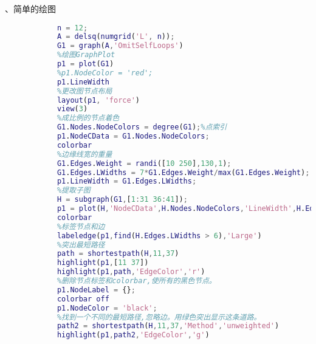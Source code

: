             、简单的绘图
            \begin{lstlisting}[language=Matlab]
            %创建graph
            n = 12;
            A = delsq(numgrid('L', n));
            G1 = graph(A,'OmitSelfLoops')
            %绘图GraphPlot
            p1 = plot(G1)
            %p1.NodeColor = 'red';
            p1.LineWidth
            %更改图节点布局
            layout(p1, 'force')
            view(3)
            %成比例的节点着色
            G1.Nodes.NodeColors = degree(G1);%点索引
            p1.NodeCData = G1.Nodes.NodeColors;
            colorbar
            %边缘线宽的重量
            G1.Edges.Weight = randi([10 250],130,1);
            G1.Edges.LWidths = 7*G1.Edges.Weight/max(G1.Edges.Weight);
            p1.LineWidth = G1.Edges.LWidths;
            %提取子图
            H = subgraph(G1,[1:31 36:41]);
            p1 = plot(H,'NodeCData',H.Nodes.NodeColors,'LineWidth',H.Edges.LWidths);
            colorbar
            %标签节点和边
            labeledge(p1,find(H.Edges.LWidths > 6),'Large')
            %突出最短路径
            path = shortestpath(H,11,37)
            highlight(p1,[11 37])
            highlight(p1,path,'EdgeColor','r')
            %删除节点标签和colorbar,使所有的黑色节点。
            p1.NodeLabel = {};
            colorbar off
            p1.NodeColor = 'black';
            %找到一个不同的最短路径,忽略边。用绿色突出显示这条道路。
            path2 = shortestpath(H,11,37,'Method','unweighted')
            highlight(p1,path2,'EdgeColor','g')
            \end{lstlisting}

